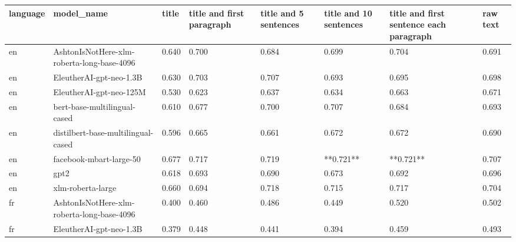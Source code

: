 \begin{tabular}{llllllll}
\toprule
language &                                 model\_name & title & title and first paragraph & title and 5 sentences & title and 10 sentences & title and first sentence each paragraph &  raw text \\
\midrule
      en & AshtonIsNotHere-xlm-roberta-long-base-4096 & 0.640 &                     0.700 &                 0.684 &                  0.699 &                                   0.704 &     0.691 \\
      en &                    EleutherAI-gpt-neo-1.3B & 0.630 &                     0.703 &                 0.707 &                  0.693 &                                   0.695 &     0.698 \\
      en &                    EleutherAI-gpt-neo-125M & 0.530 &                     0.623 &                 0.637 &                  0.634 &                                   0.663 &     0.671 \\
      en &               bert-base-multilingual-cased & 0.610 &                     0.677 &                 0.700 &                  0.707 &                                   0.684 &     0.693 \\
      en &         distilbert-base-multilingual-cased & 0.596 &                     0.665 &                 0.661 &                  0.672 &                                   0.672 &     0.690 \\
      en &                    facebook-mbart-large-50 & 0.677 &                     0.717 &                 0.719 &              **0.721** &                               **0.721** &     0.707 \\
      en &                                       gpt2 & 0.618 &                     0.693 &                 0.690 &                  0.673 &                                   0.692 &     0.696 \\
      en &                          xlm-roberta-large & 0.660 &                     0.694 &                 0.718 &                  0.715 &                                   0.717 &     0.704 \\
      fr & AshtonIsNotHere-xlm-roberta-long-base-4096 & 0.400 &                     0.460 &                 0.486 &                  0.449 &                                   0.520 &     0.502 \\
      fr &                    EleutherAI-gpt-neo-1.3B & 0.379 &                     0.448 &                 0.441 &                  0.394 &                                   0.459 &     0.493 \\

\end{tabular}
